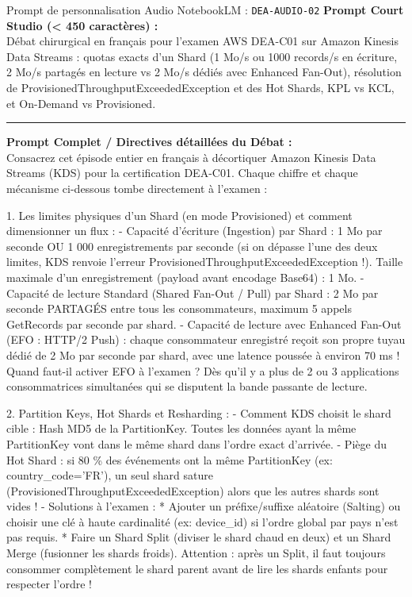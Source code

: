 \documentclass[11pt,a4paper]{article}
\begin{document}
\begin{promptbox}{Prompt de personnalisation Audio NotebookLM : \texttt{DEA-AUDIO-02}}
\textbf{Prompt Court Studio (< 450 caractères) :}\\
Débat chirurgical en français pour l'examen AWS DEA-C01 sur Amazon Kinesis Data Streams : quotas exacts d'un Shard (1 Mo/s ou 1000 records/s en écriture, 2 Mo/s partagés en lecture vs 2 Mo/s dédiés avec Enhanced Fan-Out), résolution de ProvisionedThroughputExceededException et des Hot Shards, KPL vs KCL, et On-Demand vs Provisioned.

\medskip\hrule\medskip
\textbf{Prompt Complet / Directives détaillées du Débat :}\\
Consacrez cet épisode entier en français à décortiquer Amazon Kinesis Data Streams (KDS) pour la certification DEA-C01. Chaque chiffre et chaque mécanisme ci-dessous tombe directement à l'examen :

1. Les limites physiques d'un Shard (en mode Provisioned) et comment dimensionner un flux :
- Capacité d'écriture (Ingestion) par Shard : 1 Mo par seconde OU 1 000 enregistrements par seconde (si on dépasse l'une des deux limites, KDS renvoie l'erreur ProvisionedThroughputExceededException !). Taille maximale d'un enregistrement (payload avant encodage Base64) : 1 Mo.
- Capacité de lecture Standard (Shared Fan-Out / Pull) par Shard : 2 Mo par seconde PARTAGÉS entre tous les consommateurs, maximum 5 appels GetRecords par seconde par shard.
- Capacité de lecture avec Enhanced Fan-Out (EFO : HTTP/2 Push) : chaque consommateur enregistré reçoit son propre tuyau dédié de 2 Mo par seconde par shard, avec une latence poussée à environ 70 ms ! Quand faut-il activer EFO à l'examen ? Dès qu'il y a plus de 2 ou 3 applications consommatrices simultanées qui se disputent la bande passante de lecture.

2. Partition Keys, Hot Shards et Resharding :
- Comment KDS choisit le shard cible : Hash MD5 de la PartitionKey. Toutes les données ayant la même PartitionKey vont dans le même shard dans l'ordre exact d'arrivée.
- Piège du Hot Shard : si 80 \% des événements ont la même PartitionKey (ex: country\_code='FR'), un seul shard sature (ProvisionedThroughputExceededException) alors que les autres shards sont vides !
- Solutions à l'examen :
  * Ajouter un préfixe/suffixe aléatoire (Salting) ou choisir une clé à haute cardinalité (ex: device\_id) si l'ordre global par pays n'est pas requis.
  * Faire un Shard Split (diviser le shard chaud en deux) et un Shard Merge (fusionner les shards froids). Attention : après un Split, il faut toujours consommer complètement le shard parent avant de lire les shards enfants pour respecter l'ordre !


\end{promptbox}
\end{document}
